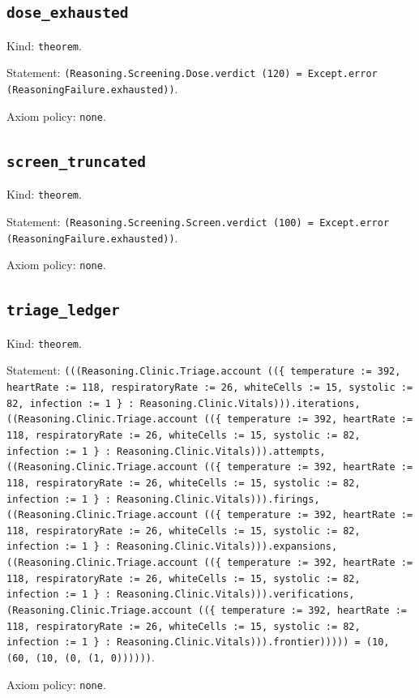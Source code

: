 \documentclass[11pt]{article}
\begin{document}
\subsection*{\texttt{dose\_exhausted}}
\noindent Kind: \texttt{theorem}.\par
\noindent Statement: \texttt{(Reasoning.Screening.Dose.verdict (120) = Except.error (ReasoningFailure.exhausted))}.\par
\noindent Axiom policy: \texttt{none}.\par
\subsection*{\texttt{screen\_truncated}}
\noindent Kind: \texttt{theorem}.\par
\noindent Statement: \texttt{(Reasoning.Screening.Screen.verdict (100) = Except.error (ReasoningFailure.exhausted))}.\par
\noindent Axiom policy: \texttt{none}.\par
\subsection*{\texttt{triage\_ledger}}
\noindent Kind: \texttt{theorem}.\par
\noindent Statement: \texttt{(((Reasoning.Clinic.Triage.account ((\{ temperature := 392, heartRate := 118, respiratoryRate := 26, whiteCells := 15, systolic := 82, infection := 1 \} : Reasoning.Clinic.Vitals))).iterations, ((Reasoning.Clinic.Triage.account ((\{ temperature := 392, heartRate := 118, respiratoryRate := 26, whiteCells := 15, systolic := 82, infection := 1 \} : Reasoning.Clinic.Vitals))).attempts, ((Reasoning.Clinic.Triage.account ((\{ temperature := 392, heartRate := 118, respiratoryRate := 26, whiteCells := 15, systolic := 82, infection := 1 \} : Reasoning.Clinic.Vitals))).firings, ((Reasoning.Clinic.Triage.account ((\{ temperature := 392, heartRate := 118, respiratoryRate := 26, whiteCells := 15, systolic := 82, infection := 1 \} : Reasoning.Clinic.Vitals))).expansions, ((Reasoning.Clinic.Triage.account ((\{ temperature := 392, heartRate := 118, respiratoryRate := 26, whiteCells := 15, systolic := 82, infection := 1 \} : Reasoning.Clinic.Vitals))).verifications, (Reasoning.Clinic.Triage.account ((\{ temperature := 392, heartRate := 118, respiratoryRate := 26, whiteCells := 15, systolic := 82, infection := 1 \} : Reasoning.Clinic.Vitals))).frontier))))) = (10, (60, (10, (0, (1, 0))))))}.\par
\noindent Axiom policy: \texttt{none}.\par
\end{document}
